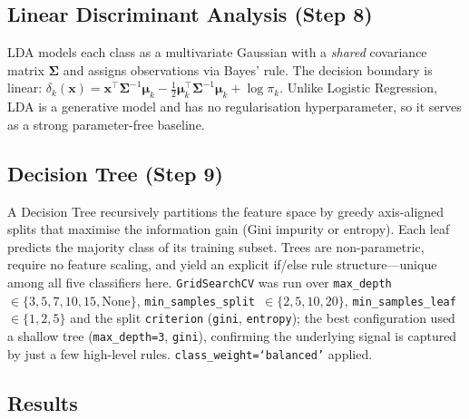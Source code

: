 \documentclass[11pt,a4paper]{article}
\begin{document}
\subsection{Linear Discriminant Analysis (Step 8)}

LDA models each class as a multivariate Gaussian with a \emph{shared} covariance
matrix $\boldsymbol{\Sigma}$ and assigns observations via Bayes' rule. The decision
boundary is linear: $\delta_k(\mathbf{x}) = \mathbf{x}^\top\boldsymbol{\Sigma}^{-1}\boldsymbol{\mu}_k
- \tfrac{1}{2}\boldsymbol{\mu}_k^\top\boldsymbol{\Sigma}^{-1}\boldsymbol{\mu}_k + \log\pi_k$.
Unlike Logistic Regression, LDA is a generative model and has no regularisation
hyperparameter, so it serves as a strong parameter-free baseline.

\subsection{Decision Tree (Step 9)}

A Decision Tree recursively partitions the feature space by greedy axis-aligned
splits that maximise the information gain (Gini impurity or entropy). Each leaf
predicts the majority class of its training subset. Trees are non-parametric,
require no feature scaling, and yield an explicit if/else rule structure---unique
among all five classifiers here. \texttt{GridSearchCV} was run over
\texttt{max\_depth}~$\in\{3,5,7,10,15,\text{None}\}$,
\texttt{min\_samples\_split}~$\in\{2,5,10,20\}$,
\texttt{min\_samples\_leaf}~$\in\{1,2,5\}$ and the split \texttt{criterion}
(\texttt{gini}, \texttt{entropy}); the best configuration used a shallow tree
(\texttt{max\_depth=3}, \texttt{gini}), confirming the underlying signal is
captured by just a few high-level rules. \texttt{class\_weight=`balanced'} applied.

\subsection{Results}
\end{document}
